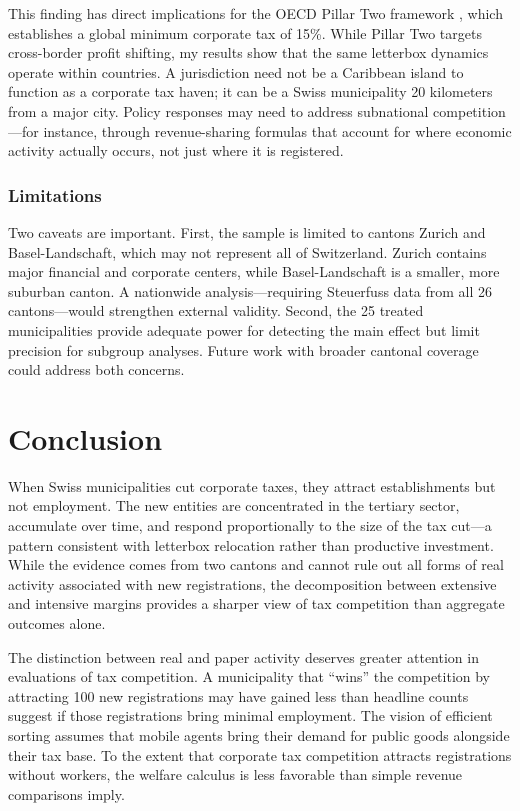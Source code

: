 \documentclass[12pt]{article}
\begin{document}
This finding has direct implications for the OECD Pillar Two framework \citep{oecd2021pillartwo}, which establishes a global minimum corporate tax of 15\%. While Pillar Two targets cross-border profit shifting, my results show that the same letterbox dynamics operate within countries. A jurisdiction need not be a Caribbean island to function as a corporate tax haven; it can be a Swiss municipality 20 kilometers from a major city. Policy responses may need to address subnational competition---for instance, through revenue-sharing formulas that account for where economic activity actually occurs, not just where it is registered.

\subsubsection*{Limitations} Two caveats are important. First, the sample is limited to cantons Zurich and Basel-Landschaft, which may not represent all of Switzerland. Zurich contains major financial and corporate centers, while Basel-Landschaft is a smaller, more suburban canton. A nationwide analysis---requiring Steuerfuss data from all 26 cantons---would strengthen external validity. Second, the 25 treated municipalities provide adequate power for detecting the main effect but limit precision for subgroup analyses. Future work with broader cantonal coverage could address both concerns.

\section{Conclusion}

When Swiss municipalities cut corporate taxes, they attract establishments but not employment. The new entities are concentrated in the tertiary sector, accumulate over time, and respond proportionally to the size of the tax cut---a pattern consistent with letterbox relocation rather than productive investment. While the evidence comes from two cantons and cannot rule out all forms of real activity associated with new registrations, the decomposition between extensive and intensive margins provides a sharper view of tax competition than aggregate outcomes alone.

The distinction between real and paper activity deserves greater attention in evaluations of tax competition. A municipality that ``wins'' the competition by attracting 100 new registrations may have gained less than headline counts suggest if those registrations bring minimal employment. The \citet{tiebout1956pure} vision of efficient sorting assumes that mobile agents bring their demand for public goods alongside their tax base. To the extent that corporate tax competition attracts registrations without workers, the welfare calculus is less favorable than simple revenue comparisons imply.
\end{document}
